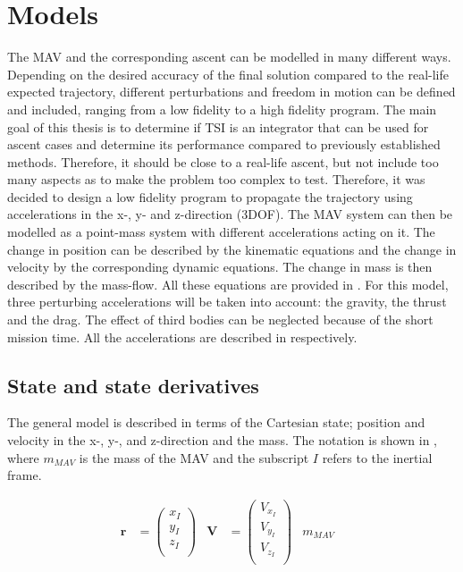 


\chapter{Models} 
\label{ch:models}
The \ac{MAV} and the corresponding ascent can be modelled in many different ways. Depending on the desired accuracy of the final solution compared to the real-life expected trajectory, different perturbations and freedom in motion can be defined and included, ranging from a low fidelity to a high fidelity program. The main goal of this thesis is to determine if \ac{TSI} is an integrator that can be used for ascent cases and determine its performance compared to previously established methods. Therefore, it should be close to a real-life ascent, but not include too many aspects as to make the problem too complex to test. Therefore, it was decided to design a low fidelity program to propagate the trajectory using accelerations in the x-, y- and z-direction (3DOF). The \ac{MAV} system can then be modelled as a point-mass system with different accelerations acting on it. The change in position can be described by the kinematic equations and the change in velocity by the corresponding dynamic equations. The change in mass is then described by the mass-flow. All these equations are provided in . For this model, three perturbing accelerations will be taken into account: the gravity, the thrust and the drag. The effect of third bodies can be neglected because of the short mission time. All the accelerations are described in  respectively. 

\section{State and state derivatives}
\label{sec:stateAndStateDerivatives}
The general model is described in terms of the Cartesian state; position and velocity in the x-, y-, and z-direction and the mass. The notation is shown in , where $m_{MAV}$ is the mass of the \ac{MAV} and the subscript $I$ refers to the inertial frame.

\begin{align} \label{eq:stateModel}
\mathbf{r}&=\begin{pmatrix}
x_{I}\\
y_{I}\\
z_{I}\\
\end{pmatrix}
&
\mathbf{V}&=\begin{pmatrix}
V_{x_{I}} \\
V_{y_{I}} \\
V_{z_{I}}\\
\end{pmatrix}
&
m_{MAV}&
\end{align}

